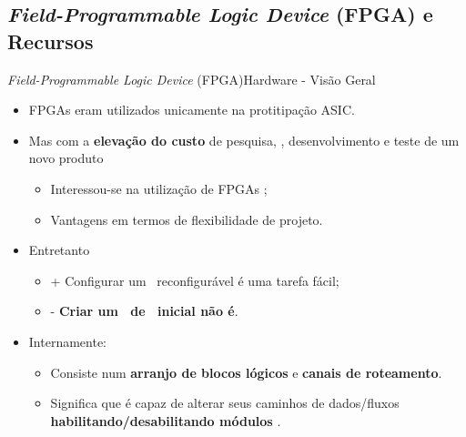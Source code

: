     
    
    
    \subsection{{\it Field-Programmable Logic Device} (FPGA) e Recursos}
    
    	\begin{frame}{\textit{Field-Programmable Logic Device} (FPGA)}{Hardware - Visão Geral}
    		\begin{itemize}
    			\setlength\itemsep{0.8em}
                \item FPGAs eram utilizados unicamente na protitipação ASIC.
                
                \item Mas com a \textbf{elevação do custo} de pesquisa, \design, desenvolvimento e teste de um novo produto
                \begin{itemize}
                    \setlength{\itemsep}{0.5em}
                    \item Interessou-se na utilização de FPGAs \cite{Mei2000};
                    \item Vantagens em termos de flexibilidade de projeto.
                \end{itemize}
                
                \item Entretanto \cite{Sass2010}
                \begin{itemize}
                    \setlength{\itemsep}{0.5em}
                    \item + Configurar um \hardware\ reconfigurável é uma tarefa fácil;
                    
                    \item - \textbf{Criar um \design\ de \hardware\ inicial não é}.
                \end{itemize}
                    \bigskip
    			\item Internamente:
    			\begin{itemize}
                    \setlength{\itemsep}{0.5em}
    				\item Consiste num \textbf{arranjo de blocos lógicos} e \textbf{canais de roteamento}.
    
    				\item Significa que é capaz de alterar seus caminhos de dados/fluxos \textbf{habilitando/desabilitando módulos} \cite{moreira2008}.
    			\end{itemize}
    		\end{itemize}
    	\end{frame}
    
